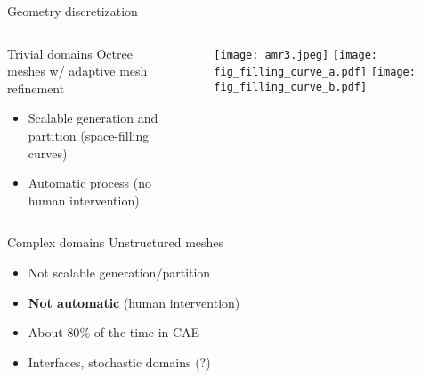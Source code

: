  \begin{frame}{Geometry discretization}

   \begin{columns}
     \begin{column}{0.5\textwidth}
       \begin{block}{Trivial domains} Octree meshes w/ adaptive mesh refinement
   \begin{itemize}

     \item Scalable generation and partition (space-filling curves)

     \item Automatic process (no human intervention)

    \end{itemize}
  \end{block}



     \end{column}
     \begin{column}{0.5\textwidth}
\begin{figure}
\texttt{[image: amr3.jpeg]}
\texttt{[image: fig\_filling\_curve\_a.pdf]}
\texttt{[image: fig\_filling\_curve\_b.pdf]}
\end{figure}

     \end{column}
   \end{columns}

   \begin{columns}
     \begin{column}{0.5\textwidth}

       \begin{block}{Complex domains}
         Unstructured meshes
       \begin{itemize}

         \item Not scalable generation/partition

         \item {\bfseries Not automatic}  (human intervention)

         \item About $80\%$ of the time in CAE

         \item Interfaces, stochastic domains (?)



\end{itemize}
\end{block}
\end{column}
\end{columns}
\end{frame}
